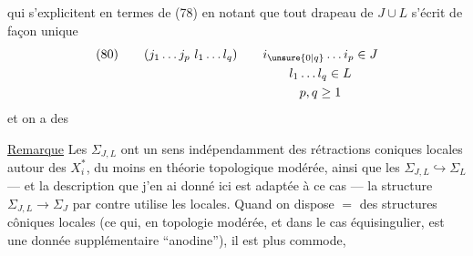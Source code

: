 
qui s'explicitent en termes de (78) en notant que tout drapeau de $J\cup L$  s'écrit de façon unique
\[
(80)\qquad(j_1\ldots j_p\ l_1\ldots l_q)\qquad
\begin{gathered}[t]
i_{\unsure{0|q}}\ldots i_p\in J\\
l_1\ldots l_q\in L\\
p,q\geq1
\end{gathered}
\]
et  on a des

\uline{Remarque} Les $\Sigma_{J,L}$ ont un sens  indépendamment des rétractions coniques locales autour des $X_i^*$, du moins en théorie topologique modérée, ainsi que les $\Sigma_{J,L}\hookrightarrow\Sigma_L$ --- et la description que j'en ai donné ici est adaptée à ce cas --- la structure $\Sigma_{J,L}\to\Sigma_J$ par contre utilise les     locales. Quand on dispose $=$ des structures côniques locales (ce qui, en topologie modérée, et dans le cas équisingulier, est une donnée supplémentaire ``anodine''), il est plus commode,

